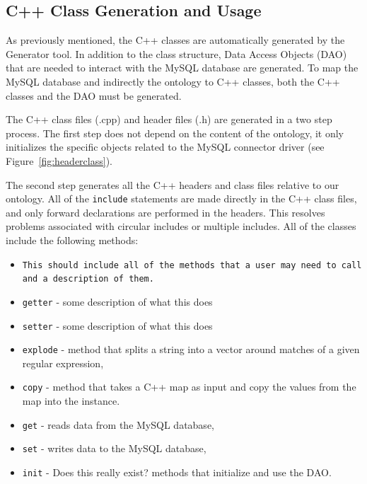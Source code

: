 \subsection{C++ Class Generation and Usage}
As previously mentioned, the C++ classes are automatically generated by the Generator tool. In addition to the class structure, 
Data Access Objects (DAO) that are needed to interact with the MySQL database are generated. 
To map the MySQL database and indirectly the ontology to C++ classes, both the C++ classes and
the DAO must be generated.

The C++ class files (.cpp) and header files (.h) are generated in a two step process.
The first step does not depend on the content of the ontology, it only initializes the specific objects related to the MySQL connector driver
(see Figure~\ref{fig:headerclass}).

The second step generates all the C++ headers and class files relative to our ontology. 
All of the \texttt{include} statements  are made directly in the C++ class files, and only forward declarations are performed in the headers. 
This resolves problems associated with circular includes or multiple includes. All of the classes include the following methods:
\begin{itemize}
\item \texttt{This should include all of the methods that a user may need to call and a description of them.}
\item \texttt{getter} - some description of what this does
\item \texttt{setter} - some description of what this does
\item \texttt{explode} - method that splits a string into a vector around matches of a given regular expression, 
\item \texttt{copy} -  method that takes a C++ map as input and copy the values from the map into the instance. 
\item \texttt{get} - reads data from the MySQL database,
\item \texttt{set} - writes data to the MySQL database,
\item \texttt{init} - Does this really exist? methods that initialize and use the DAO.
\end{itemize}

